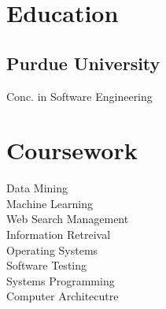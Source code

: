 \documentclass[]{resume-openfont}
\begin{document}
%
%

%
%




%
%

\begin{minipage}[t]{0.26\textwidth} 


\section{\textcolor{primary1}{Education}}

\subsection{Purdue University}
Conc. in Software Engineering \\
\sectionsep


\sectionsep



\section{\textcolor{primary2}{Coursework}}
Data Mining\\
Machine Learning\\
Web Search Management\\
Information Retreival\\ 
Operating Systems \\
Software Testing \\
Systems Programming \\
Computer Architecutre \\ 
\sectionsep



\end{minipage}
\end{document}
